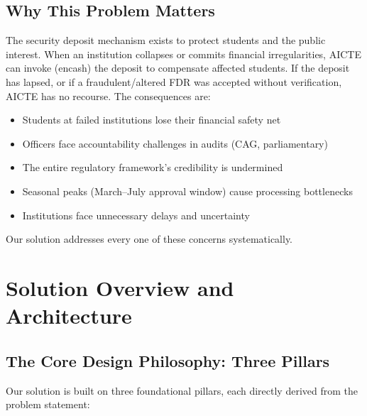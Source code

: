 \documentclass[12pt, a4paper]{report}
\begin{document}
\section{Why This Problem Matters}

The security deposit mechanism exists to protect students and the public interest. When an institution collapses or commits financial irregularities, AICTE can invoke (encash) the deposit to compensate affected students. If the deposit has lapsed, or if a fraudulent/altered FDR was accepted without verification, AICTE has no recourse. The consequences are:

\begin{itemize}
  \item Students at failed institutions lose their financial safety net
  \item Officers face accountability challenges in audits (CAG, parliamentary)
  \item The entire regulatory framework's credibility is undermined
  \item Seasonal peaks (March--July approval window) cause processing bottlenecks
  \item Institutions face unnecessary delays and uncertainty
\end{itemize}

Our solution addresses every one of these concerns systematically.


\chapter{Solution Overview and Architecture}

\section{The Core Design Philosophy: Three Pillars}

Our solution is built on three foundational pillars, each directly derived from the problem statement:
\end{document}

